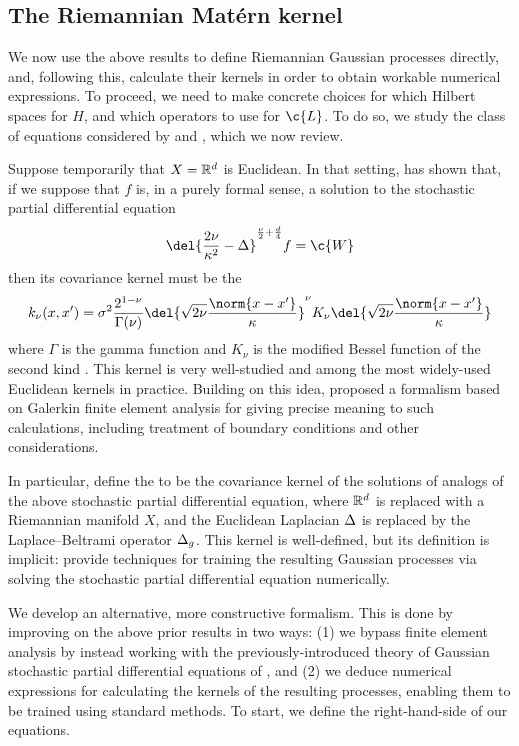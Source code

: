 \documentclass[11pt]{book}
\begin{document}
\subsection{The Riemannian Matérn kernel}

We now use the above results to define Riemannian Gaussian processes directly, and, following this, calculate their kernels in order to obtain workable numerical expressions.
To proceed, we need to make concrete choices for which Hilbert spaces for $H$, and which operators to use for $\c{L}$.
To do so, we study the class of equations considered by \textcite{whittle63} and \textcite{lindgren11}, which we now review.

Suppose temporarily that $X = \mathbb{R}^d$ is Euclidean.
In that setting, \textcite{whittle63} has shown that, if we suppose that $f$ is, in a purely formal sense, a solution to the stochastic partial differential equation
\[
\del{\frac{2\nu}{\kappa^2} - \lap}^{\frac{\nu}{2} + \frac{d}{4}} f = \c{W}
\]
then its covariance kernel must be the 
\[
k_{\nu}(x,x') = \sigma^2 \frac{2^{1-\nu}}{\Gamma(\nu)} \del{\sqrt{2\nu} \frac{\norm{x-x'}}{\kappa}}^\nu K_\nu \del{\sqrt{2\nu} \frac{\norm{x-x'}}{\kappa}}
\]
where $\Gamma$ is the gamma function and $K_\nu$ is the modified Bessel function of the second kind \cite{gradshteyn14}.
This kernel is very well-studied and among the most widely-used Euclidean kernels in practice.
Building on this idea, \textcite{lindgren11} proposed a formalism based on Galerkin finite element analysis for giving precise meaning to such calculations, including treatment of boundary conditions and other considerations.

In particular, \textcite{lindgren11} define the  to be the covariance kernel of the solutions of analogs of the above stochastic partial differential equation, where $\mathbb{R}^d$ is replaced with a Riemannian manifold $X$, and the Euclidean Laplacian $\Delta$ is replaced by the Laplace--Beltrami operator $\Delta_g$.
This kernel is well-defined, but its definition is implicit: \textcite{lindgren11} provide techniques for training the resulting Gaussian processes via solving the stochastic partial differential equation numerically.

We develop an alternative, more constructive formalism.
This is done by improving on the above prior results in two ways: (1) we bypass finite element analysis by instead working with the previously-introduced theory of Gaussian stochastic partial differential equations of \textcite{lototsky17}, and (2) we deduce numerical expressions for calculating the kernels of the resulting processes, enabling them to be trained using standard methods.
To start, we define the right-hand-side of our equations.
\end{document}
